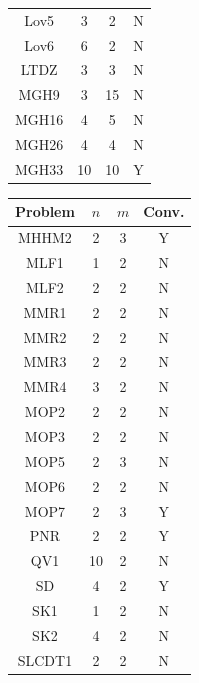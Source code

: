 \documentclass[11pt]{article}
\newcommand{\myscaletable}{0.6}
\newcommand{\lightgray}{0.95}
\numberwithin{assumption}{section}
\begin{document}
\begin{table}[H]
\begin{minipage}{0.40\textwidth}
\begin{threeparttable}
{\begin{tabular}{|cccc|}
Lov5& 3 & 2 & N\\
Lov6&  6 & 2  & N\\  \rowcolor[gray]{\lightgray}
LTDZ&   3 &  3 &  N  \\ 
MGH9&  3 & 15  & N   \\    \rowcolor[gray]{\lightgray}
MGH16&    4 &  5 & N   \\ 
MGH26 &   4 &  4 & N  \\   \rowcolor[gray]{\lightgray}
MGH33 &    10 &  10 & Y  \\ 
\hline
\end{tabular}}
\end{threeparttable}
\end{minipage} \hspace{12pt}
%
\begin{minipage}{0.40\textwidth}
\begin{threeparttable}{\scriptsize
\fontsize{7.0}{8.0}\selectfont
\renewcommand{\arraystretch}{\myscaletable}
\begin{tabular}{|cccc|} 
\hline
\rowcolor[gray]{.85} Problem &$n$  & $m$ & Conv. \\ 
\hline              
MHHM2&   2 &  3 & Y   \\   \rowcolor[gray]{\lightgray}
MLF1&  1 & 2  &  N  \\
MLF2&     2 &  2 & N  \\   \rowcolor[gray]{\lightgray}
MMR1  &      2 &  2 & N     \\
MMR2&  2 & 2  &  N   \\   \rowcolor[gray]{\lightgray}
MMR3  &      2 &  2 & N  \\ 
MMR4& 3 & 2  & N   \\ \rowcolor[gray]{\lightgray}
MOP2 &       2 &  2 & N    \\  
MOP3 &     2 &  2 & N    \\ \rowcolor[gray]{\lightgray}
MOP5&      2 &  3 & N   \\
MOP6&  2 & 2  & N   \\    \rowcolor[gray]{\lightgray}
MOP7&      2 &  3 & Y   \\  
PNR&   2 &  2 & Y  \\    \rowcolor[gray]{\lightgray}
QV1&    10 &  2 & N  \\  
SD &  4 & 2  &  Y  \\   \rowcolor[gray]{\lightgray}
SK1 &       1 &  2 & N    \\ 
SK2 &       4 &  2 & N   \\    \rowcolor[gray]{\lightgray}
SLCDT1&     2 &  2 & N   \\ 

\end{tabular}}
\end{threeparttable}
\end{minipage}
\end{table}
\end{document}
